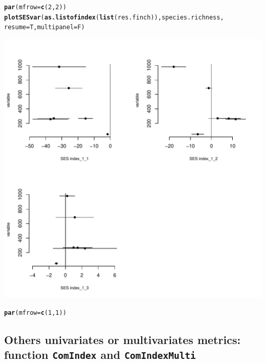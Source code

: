 \documentclass[12pt]{article}\usepackage[]{graphicx}\usepackage[]{color}
\makeatletter
\def\maxwidth{ %
  \ifdim\Gin@nat@width>\linewidth
    \linewidth
  \else
    \Gin@nat@width
  \fi
}
\newcommand{\hlnum}[1]{\textcolor[rgb]{0.686,0.059,0.569}{#1}}%
\newcommand{\hlstd}[1]{\textcolor[rgb]{0.345,0.345,0.345}{#1}}%
\newcommand{\hlkwc}[1]{\textcolor[rgb]{0.333,0.667,0.333}{#1}}%
\newcommand{\hlkwd}[1]{\textcolor[rgb]{0.737,0.353,0.396}{\textbf{#1}}}%
\newenvironment{kframe}{%
 \def\at@end@of@kframe{}%
 \ifinner\ifhmode%
  \def\at@end@of@kframe{\end{minipage}}%
  \begin{minipage}{\columnwidth}%
 \fi\fi%
 \def\FrameCommand##1{\hskip\@totalleftmargin \hskip-\fboxsep
 \colorbox{shadecolor}{##1}\hskip-\fboxsep
     \hskip-\linewidth \hskip-\@totalleftmargin \hskip\columnwidth}%
 \MakeFramed {\advance\hsize-\width
   \@totalleftmargin\z@ \linewidth\hsize
   \@setminipage}}%
 {\par\unskip\endMakeFramed%
 \at@end@of@kframe}
\newenvironment{knitrout}{}{} %
\makeatother
\begin{document}
\begin{knitrout}
\color{fgcolor}\begin{kframe}
\begin{alltt}
\hlkwd{par}\hlstd{(}\hlkwc{mfrow} \hlstd{=} \hlkwd{c}\hlstd{(}\hlnum{2}\hlstd{,}\hlnum{2}\hlstd{))}
\hlkwd{plotSESvar}\hlstd{(}\hlkwd{as.listofindex}\hlstd{(}\hlkwd{list}\hlstd{(res.finch)), species.richness,}
       \hlkwc{resume} \hlstd{= T,} \hlkwc{multipanel} \hlstd{= F)}
\end{alltt}
\end{kframe}
\includegraphics[width=\maxwidth]{figure/unnamed-chunk-41} 
\begin{kframe}\begin{alltt}
\hlkwd{par}\hlstd{(}\hlkwc{mfrow} \hlstd{=} \hlkwd{c}\hlstd{(}\hlnum{1}\hlstd{,}\hlnum{1}\hlstd{))}
\end{alltt}
\end{kframe}
\end{knitrout}


\newpage
\subsection{Others univariates or multivariates metrics: function \texttt{ComIndex} and \texttt{ComIndexMulti}}
\end{document}
